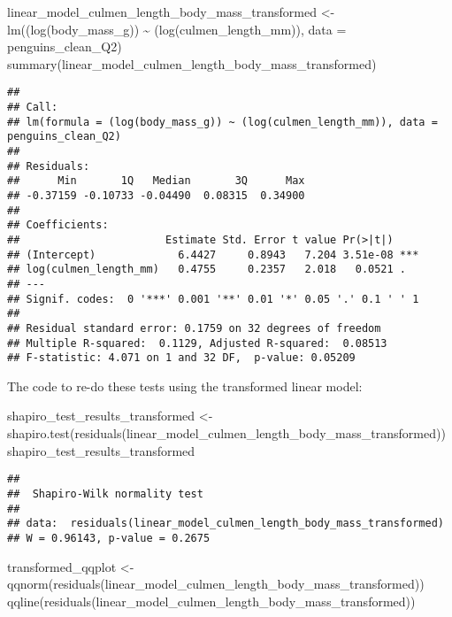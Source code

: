 \documentclass[
]{article}
\newenvironment{Shaded}{\begin{snugshade}}{\end{snugshade}}
\newcommand{\AttributeTok}[1]{\textcolor[rgb]{0.77,0.63,0.00}{#1}}
\newcommand{\FunctionTok}[1]{\textcolor[rgb]{0.00,0.00,0.00}{#1}}
\newcommand{\NormalTok}[1]{#1}
\newcommand{\OtherTok}[1]{\textcolor[rgb]{0.56,0.35,0.01}{#1}}
\newcommand{\SpecialCharTok}[1]{\textcolor[rgb]{0.00,0.00,0.00}{#1}}
\begin{document}
\begin{Shaded}
\begin{Highlighting}[]
\NormalTok{linear\_model\_culmen\_length\_body\_mass\_transformed }\OtherTok{\textless{}{-}} \FunctionTok{lm}\NormalTok{((}\FunctionTok{log}\NormalTok{(body\_mass\_g)) }\SpecialCharTok{\textasciitilde{}}\NormalTok{ (}\FunctionTok{log}\NormalTok{(culmen\_length\_mm)), }\AttributeTok{data =}\NormalTok{ penguins\_clean\_Q2)}
\FunctionTok{summary}\NormalTok{(linear\_model\_culmen\_length\_body\_mass\_transformed)}
\end{Highlighting}
\end{Shaded}

\begin{verbatim}
## 
## Call:
## lm(formula = (log(body_mass_g)) ~ (log(culmen_length_mm)), data = penguins_clean_Q2)
## 
## Residuals:
##      Min       1Q   Median       3Q      Max 
## -0.37159 -0.10733 -0.04490  0.08315  0.34900 
## 
## Coefficients:
##                       Estimate Std. Error t value Pr(>|t|)    
## (Intercept)             6.4427     0.8943   7.204 3.51e-08 ***
## log(culmen_length_mm)   0.4755     0.2357   2.018   0.0521 .  
## ---
## Signif. codes:  0 '***' 0.001 '**' 0.01 '*' 0.05 '.' 0.1 ' ' 1
## 
## Residual standard error: 0.1759 on 32 degrees of freedom
## Multiple R-squared:  0.1129, Adjusted R-squared:  0.08513 
## F-statistic: 4.071 on 1 and 32 DF,  p-value: 0.05209
\end{verbatim}

The code to re-do these tests using the transformed linear model:

\begin{Shaded}
\begin{Highlighting}[]
\NormalTok{shapiro\_test\_results\_transformed }\OtherTok{\textless{}{-}} \FunctionTok{shapiro.test}\NormalTok{(}\FunctionTok{residuals}\NormalTok{(linear\_model\_culmen\_length\_body\_mass\_transformed))}
\NormalTok{shapiro\_test\_results\_transformed}
\end{Highlighting}
\end{Shaded}

\begin{verbatim}
## 
##  Shapiro-Wilk normality test
## 
## data:  residuals(linear_model_culmen_length_body_mass_transformed)
## W = 0.96143, p-value = 0.2675
\end{verbatim}

\begin{Shaded}
\begin{Highlighting}[]
\NormalTok{transformed\_qqplot }\OtherTok{\textless{}{-}}\FunctionTok{qqnorm}\NormalTok{(}\FunctionTok{residuals}\NormalTok{(linear\_model\_culmen\_length\_body\_mass\_transformed))}
\FunctionTok{qqline}\NormalTok{(}\FunctionTok{residuals}\NormalTok{(linear\_model\_culmen\_length\_body\_mass\_transformed))}
\end{Highlighting}
\end{Shaded}
\end{document}
